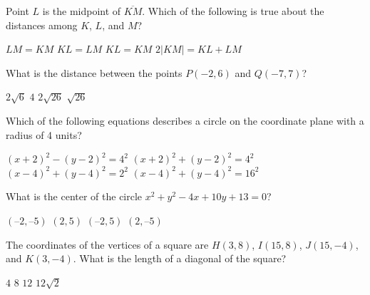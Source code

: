 \begin{questions}
\question Point $L$ is the midpoint of $\overline{KM}$. Which of the following is true about the distances among $K$, $L$, and $M$? 
\begin{multicols}{2}
\begin{choices}  
\choice $LM=KM$
\CorrectChoice $KL=LM$
\choice $KL=KM$
\choice $2|KM|=KL+LM$
\end{choices}
\end{multicols} 

\question What is the distance between the points $P(-2, 6)$ and $Q(-7, 7)$? 
\begin{multicols}{4}
\begin{choices}  
\choice $2\sqrt{6}$
\choice $4$
\choice $2\sqrt{26}$
\CorrectChoice $\sqrt{26}$
\end{choices}
\end{multicols} 

\question Which of the following equations describes a circle on the coordinate plane with a radius of 4 units? 
\begin{multicols}{2}
\begin{choices}  
\choice $(x+2)^2 - (y-2)^2 = 4^2$
\CorrectChoice $(x+2)^2 + (y-2)^2 = 4^2$
\choice $(x-4)^2 + (y-4)^2 = 2^2$
\choice $(x-4)^2 + (y-4)^2 = 16^2$
\end{choices}
\end{multicols} 

\question What  is the  center  of  the  circle  $x^2+y^2-4x+10y+13=0$?  
\begin{multicols}{4}
\begin{choices} 
\choice $(–2,  –5)$
\choice $(2,  5)$
\choice $(–2,  5)$
\choice $(2,  –5)$
\end{choices}
\end{multicols} 

\question The coordinates of the vertices of a square are $H(3, 8)$, $I(15, 8)$,           $J(15, -4)$, and $K(3, -4)$. What is the length of a diagonal of the square?  
\begin{multicols}{4}
\begin{choices}  
\choice $4$ 
\choice $8$ 
\choice $12$ 
\choice $12\sqrt{2} $
\end{choices}
\end{multicols} 

\end{questions}